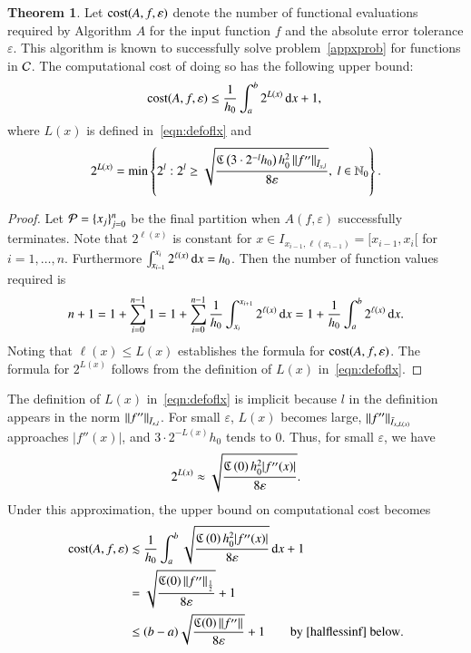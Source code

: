\documentclass[review]{elsarticle}
\newcommand{\abstol}{\varepsilon}
\theoremstyle{definition}
\newtheorem{theorem}{Theorem}
\begin{document}
\begin{theorem}\label{thm:cost}
Let $\cost(A,f,\abstol)$ denote the number of functional evaluations required by
Algorithm $A$ for the input function $f$ and the absolute error tolerance
$\abstol$. This algorithm is known to successfully solve
problem~\eqref{appxprob} for functions in $\cc$. The computational cost of doing
so has the following upper bound:
\begin{equation*}
\cost(A,f,\abstol) \le \frac{1}{h_0}\int_a^b 2^{L(x)} \, \dif x +1 , \\
\end{equation*}
where $L(x)$ is defined in~\eqref{eqn:defoflx} and
\begin{equation*}
2^{L(x)} = \min\left\{2^l:  2^l \ge \sqrt{\frac{\fC\left(3\cdot 2^{-l} h_0\right) h_0^2 \norm[\bar{I}_{x,l}]{f''} }{8 \abstol}}, \  l \in  \natzero\right\}.
\end{equation*}
\end{theorem}

\begin{proof}
Let $\cp=\{x_j\}_{j=0}^n$ be the final partition when $A(f,\abstol)$
successfully terminates. Note that $2^{\ell(x)}$ is constant for $x \in
I_{x_{i-1},\ell(x_{i-1})} = [x_{i-1},x_{i}[$ for $i=1, \ldots, n$. Furthermore
$\int_{x_{i-1}}^{x_{i}} 2^{\ell(x)} \, \dif x = h_0$. Then the number of
function values required is
\begin{equation*}
n+1 = 1 + \sum_{i=0}^{n-1} 1 = 1 + \sum_{i=0}^{n-1} \frac{1}{h_0} \int_{x_i}^{x_{i+1}} 2^{\ell(x)} \, \dif  x = 1 + \frac{1}{h_0}\int_a^b 2^{\ell(x)} \, \dif x.
\end{equation*}
Noting that $\ell(x) \le L(x)$ establishes the formula for $\cost(A,f,\abstol)$.
The formula for $2^{L(x)}$ follows from the definition of $L(x)$
in~\eqref{eqn:defoflx}.
\end{proof}

The definition of $L(x)$ in~\eqref{eqn:defoflx} is implicit because $l$ in the
definition appears in the norm $\norm[\bar{I}_{x,l}]{f''}$. For small $\abstol$,
$L(x)$ becomes large, $\norm[\bar{I}_{x,L(x)}]{f''}$ approaches $|f''(x)|$, and
$3\cdot 2^{-L(x)}h_0$ tends to $0$. Thus, for small $\abstol$, we have
\begin{equation} \label{twoLxapprox}
 2^{L(x)} \approx \sqrt{\frac{\fC\left(0\right)  h_0^2 |f''(x)|}{8\abstol}}.
 \end{equation}
Under this approximation, the upper bound on computational cost becomes
\begin{align}
\nonumber
\cost(A,f,\abstol)  &\lesssim \frac{1}{h_0}\int_a^b \sqrt{\frac{\fC\left(0\right)  h_0^2 |f''(x)|}{8\abstol}} \, \dif x +1 \\
& =\sqrt{\frac{\fC(0) \norm[\frac 12]{f''}}{8\abstol}} +1 \label{costbdapprox} \\
& \le (b-a)\sqrt{\frac{\fC(0) \norm{f''}}{8\abstol}} +1 \label{costbdinf}  \qquad \text{by \eqref{halflessinf} below}.
\end{align}
\end{document}
